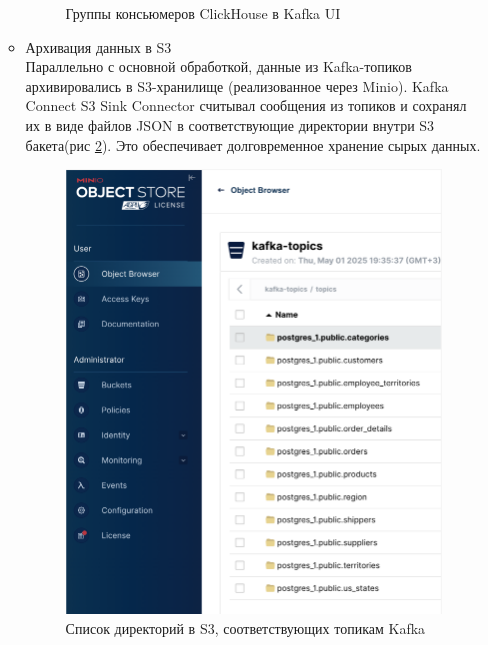 \begin{enumerate}[1.]
\begin{itemize}
\begin{figure}[h]
                        \caption{Группы консьюмеров ClickHouse в Kafka UI}
                        \label{fig:ex1_kafka_ch_consumer}
                    \end{figure}
                    \FloatBarrier
              \item Архивация данных в S3\\
                    Параллельно с основной обработкой, данные из Kafka-топиков архивировались
                    в S3-хранилище (реализованное через Minio). Kafka Connect S3 Sink Connector считывал сообщения
                    из топиков и сохранял их в виде файлов JSON в соответствующие директории внутри S3 бакета(рис \ref{fig:ex1_s3}). Это обеспечивает долговременное хранение сырых данных.
                    \begin{figure}[h]
                        \center
                        \includegraphics [scale=0.45] {my_folder/images/ex1_s3}
                        \caption{ Список директорий в S3, соответствующих топикам Kafka}
                        \label{fig:ex1_s3}
                    \end{figure}
                    \FloatBarrier

\end{itemize}
\end{enumerate}
